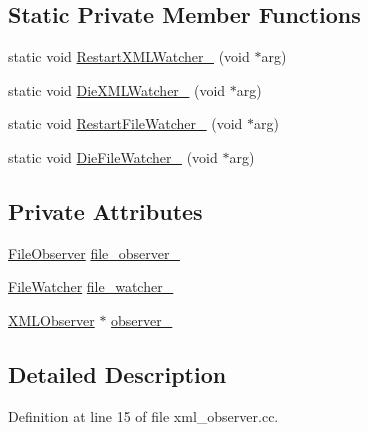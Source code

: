 \subsection*{Static Private Member Functions}
\begin{DoxyCompactItemize}
\item 
static void \hyperlink{classmocha_1_1_x_m_l_observer_1_1_x_m_l_updater_a613b546f3a88b7efc735e247161ebbb4}{RestartXMLWatcher\_\-} (void $\ast$arg)
\item 
static void \hyperlink{classmocha_1_1_x_m_l_observer_1_1_x_m_l_updater_aad65829fbb88fe014899c38094a2cf26}{DieXMLWatcher\_\-} (void $\ast$arg)
\item 
static void \hyperlink{classmocha_1_1_x_m_l_observer_1_1_x_m_l_updater_ae5058f649435e803f5c3a9e05a9c8c69}{RestartFileWatcher\_\-} (void $\ast$arg)
\item 
static void \hyperlink{classmocha_1_1_x_m_l_observer_1_1_x_m_l_updater_a72de661df0311bd6bad576c15dc0b13a}{DieFileWatcher\_\-} (void $\ast$arg)
\end{DoxyCompactItemize}
\subsection*{Private Attributes}
\begin{DoxyCompactItemize}
\item 
\hyperlink{classmocha_1_1_file_observer}{FileObserver} \hyperlink{classmocha_1_1_x_m_l_observer_1_1_x_m_l_updater_a55d86bb53c933323f123e1ad9bd4844c}{file\_\-observer\_\-}
\item 
\hyperlink{classmocha_1_1_file_watcher}{FileWatcher} \hyperlink{classmocha_1_1_x_m_l_observer_1_1_x_m_l_updater_aa775c8ff2cf07901e5e2b615302a1789}{file\_\-watcher\_\-}
\item 
\hyperlink{classmocha_1_1_x_m_l_observer}{XMLObserver} $\ast$ \hyperlink{classmocha_1_1_x_m_l_observer_1_1_x_m_l_updater_ad29a952b6d6a56e7780b442d655f9810}{observer\_\-}
\end{DoxyCompactItemize}


\subsection{Detailed Description}


Definition at line 15 of file xml\_\-observer.cc.



